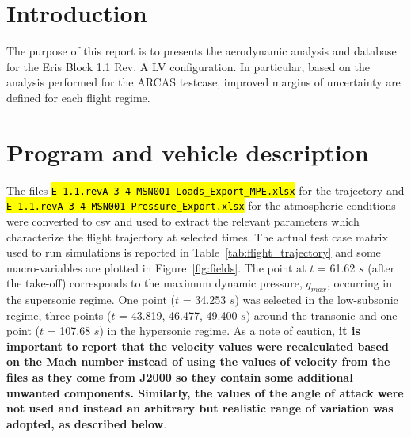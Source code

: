 \documentclass[12pt]{article}
\begin{document}
\newpage

\section{Introduction}\label{sec:intro}
The purpose of this report is to presents the aerodynamic analysis and database for the {Eris Block 1.1 Rev. A} LV configuration. In particular, based on the analysis performed for the ARCAS testcase, improved margins of uncertainty are defined for each flight regime.

\section{Program and vehicle description}\label{sec:description}
The files \texttt{\hl{E-1.1.revA-3-4-MSN001 Loads\_Export\_MPE.xlsx}} for the trajectory and \texttt{\hl{E-1.1.revA-3-4-MSN001 Pressure\_Export.xlsx}} for the atmospheric conditions were converted to csv and used to extract the relevant parameters which characterize the flight trajectory at selected times. The actual test case matrix used to run simulations is reported in Table~\ref{tab:flight_trajectory} and some macro-variables are plotted in Figure~\ref{fig:fields}. The point at $t$ = 61.62 $s$ (after the take-off) corresponds to the maximum dynamic pressure, $q_{max}$, occurring in the supersonic regime. One point ($t$ = 34.253 $s$) was selected in the low-subsonic regime, three points ($t$ = 43.819, 46.477, 49.400 $s$) around the transonic and one point ($t$ = 107.68 $s$) in the hypersonic regime. As a note of caution, \textbf{it is important to report that the velocity values were recalculated based on the Mach number instead of using the values of velocity from the files as they come from J2000 so they contain some additional unwanted components. Similarly, the values of the angle of attack were not used and instead an arbitrary but realistic range of variation was adopted, as described below}.
%

%
\end{document}
